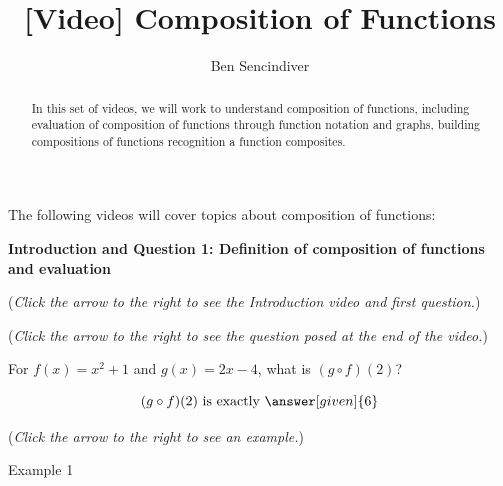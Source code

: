 \documentclass{ximera}
\title[Prerequisite Videos: ]{[Video] Composition of Functions}
\author{Ben Sencindiver}
\begin{document}
\begin{abstract}
  In this set of videos, we will work to understand
  composition of functions, including evaluation 
  of composition of functions through function 
  notation and graphs, building compositions of functions
  recognition a function composites.  
\end{abstract}
\maketitle

The following videos will cover topics about composition of functions:

\textbf{Introduction and Question 1: Definition 
  of composition of functions and  evaluation}
\begin{question}
\begin{flushright}
{\color{blue}(\emph{Click the arrow to the right to see the Introduction video and first question.})}
\end{flushright}
\begin{center}
\begin{expandable}
{\color{blue}(\emph{Click the arrow to the right to see the question
posed at the end of the video.})}
\begin{expandable}
For $f(x) = x^2 + 1$ and $g(x) =2x-4$, what is $(g \circ f)(2)$?\\
\begin{prompt}
\[
(g\circ f)(2) \text{ is exactly }\answer[given]{6}
\]
\end{prompt}
\begin{flushright}
{\color{blue}(\emph{Click the arrow to the right to see an example.})}
\end{flushright}
\begin{expandable}
Example 1
\end{expandable}
\end{expandable}
\end{expandable}
\end{center}
\end{question}
\end{document}
